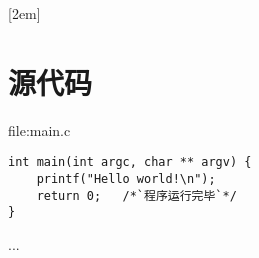 
[2em]{\vspace{.5\baselineskip}\bf\xiaosi\song}
             {\prechaptername\CJKnumber{\thecontentslabel}\postchaptername\qquad}{}{}             							%
\setcounter{page}{1}    	%

\chapter*{源代码}
\noindent
file:main.c
\begin{lstlisting}
int main(int argc, char ** argv) {
    printf("Hello world!\n");
    return 0;	/*`程序运行完毕`*/
}
\end{lstlisting}

...
